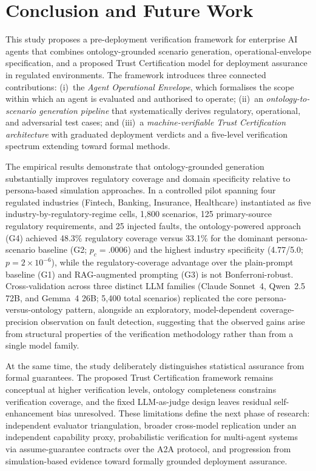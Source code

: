 \documentclass[11pt,a4paper]{article}
\begin{document}
\section{Conclusion and Future Work}
\label{sec:conclusion}

This study proposes a pre-deployment verification framework for
enterprise AI agents that combines ontology-grounded scenario
generation, operational-envelope specification, and a proposed Trust
Certification model for deployment assurance in regulated
environments. The framework introduces three connected contributions:
(i)~the \emph{Agent Operational Envelope}, which formalises the scope
within which an agent is evaluated and authorised to operate; (ii)~an
\emph{ontology-to-scenario generation pipeline} that systematically
derives regulatory, operational, and adversarial test cases; and
(iii)~a \emph{machine-verifiable Trust Certification architecture}
with graduated deployment verdicts and a five-level verification
spectrum extending toward formal methods.

The empirical results demonstrate that ontology-grounded generation
substantially improves regulatory coverage and domain specificity
relative to persona-based simulation approaches. In a controlled pilot
spanning four regulated industries (Fintech, Banking, Insurance,
Healthcare) instantiated as five industry-by-regulatory-regime cells,
1{,}800 scenarios, 125 primary-source regulatory requirements, and
25 injected faults, the ontology-powered approach (G4) achieved
48.3\% regulatory coverage versus 33.1\% for the dominant
persona-scenario baseline (G2; $p_c{=}.0006$) and the highest
industry specificity (4.77/5.0; $p{=}2{\times}10^{-6}$), while the
regulatory-coverage advantage over the plain-prompt baseline (G1)
and RAG-augmented prompting (G3) is not Bonferroni-robust. Cross-validation across three distinct LLM
families (Claude Sonnet~4, Qwen~2.5 72B, and Gemma~4 26B; 5{,}400
total scenarios) replicated the core persona-versus-ontology pattern,
alongside an exploratory, model-dependent coverage-precision
observation on fault detection, suggesting that the observed gains
arise from structural properties of the verification methodology
rather than from a single model family.

At the same time, the study deliberately distinguishes statistical
assurance from formal guarantees. The proposed Trust Certification
framework remains conceptual at higher verification levels, ontology
completeness constrains verification coverage, and the fixed
LLM-as-judge design leaves residual self-enhancement bias unresolved.
These limitations define the next phase of research: independent
evaluator triangulation, broader cross-model replication under an
independent capability proxy, probabilistic verification for
multi-agent systems via assume-guarantee contracts over the A2A
protocol, and progression from simulation-based evidence toward
formally grounded deployment assurance.
\end{document}
